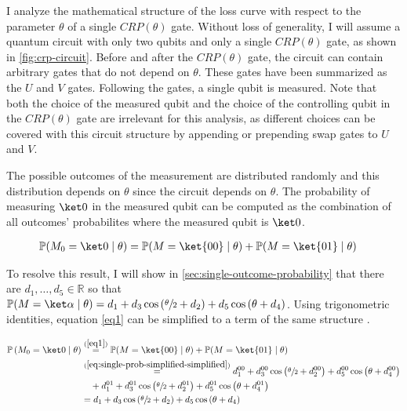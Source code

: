 I analyze the mathematical structure of the loss curve with respect to the
parameter $\theta$ of a single $CRP(\theta)$ gate.
Without loss of generality, I will assume a quantum circuit with only two
qubits and only a single $CRP(\theta)$ gate, as shown in
\autoref{fig:crp-circuit}.
Before and after the $CRP(\theta)$ gate, the circuit can contain arbitrary gates
that do not depend on $\theta$.
These gates have been summarized as the $U$ and $V$ gates.
Following the gates, a single qubit is measured.
Note that both the choice of the measured qubit and the choice of the
controlling qubit in the $CRP(\theta)$ gate are irrelevant for this analysis, as
different choices can be covered with this circuit structure by appending or
prepending swap gates to $U$ and $V$.

The possible outcomes of the measurement are distributed randomly and this
distribution depends on $\theta$ since the circuit depends on $\theta$.
The probability of measuring $\ket 0$ in the measured qubit can be computed as
the combination of all outcomes' probabilites where the measured qubit is
$\ket 0$.

\begin{equation}
    \label{eq1}
    \begin{split}
        \mathbb{P}(M_0 = \ket 0 \mid \theta)
            &= \mathbb{P}(M = \ket{00} \mid \theta) + \mathbb{P}(M = \ket{01} \mid \theta)
    \end{split}
\end{equation}

To resolve this result, I will show in \autoref{sec:single-outcome-probability}
that there are $d_1, \dots, d_5 \in \mathbb R$ so that
$\mathbb P(M = \ket\alpha \mid \theta) = d_1 + d_3 \cos\left(\sfrac\theta2 + d_2\right) + d_5 \cos\left(\theta + d_4\right)$.
Using trigonometric identities, equation \ref{eq1} can be simplified to a term
of the same structure \cite{bronstejn_taschenbuch_2016}.

\begin{equation}
    \label{eq:total-result-probability}
    \begin{split}
        \mathbb P\left(M_0 = \ket 0 \mid \theta\right)
            &\stackrel{(\ref{eq1})}=
                \mathbb{P}(M = \ket{00} \mid \theta) + \mathbb{P}(M = \ket{01} \mid \theta) \\
            &\stackrel{(\ref{eq:single-prob-simplified-simplified})}=
                d_1^{00} + d_3^{00} \cos\left(\sfrac\theta2 + d_2^{00}\right) + d_5^{00} \cos\left(\theta + d_4^{00}\right) \\
                &\quad + d_1^{01} + d_3^{01} \cos\left(\sfrac\theta2 + d_2^{01}\right) + d_5^{01} \cos\left(\theta + d_4^{01}\right) \\
            &= d_1 + d_3 \cos\left(\sfrac\theta2 + d_2\right) + d_5 \cos\left(\theta + d_4\right)
    \end{split}
\end{equation}

